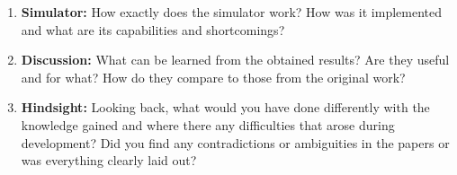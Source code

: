 \documentclass[../review.tex]{subfiles}
\begin{document}
 \textcolor{green}{\Large\checkmark}
\begin{enumerate}
 \item \textbf{Simulator:} How exactly does the simulator work? How was it implemented and what are its capabilities and shortcomings?
 \item \textbf{Discussion:} What can be learned from the obtained results? Are they useful and for what? How do they compare to those from the original work?
 \item \textbf{Hindsight:} Looking back, what would you have done differently with the knowledge gained and where there any difficulties that arose during development? Did you find any contradictions or ambiguities in the papers or was everything clearly laid out? 
\end{enumerate}
\end{document}
